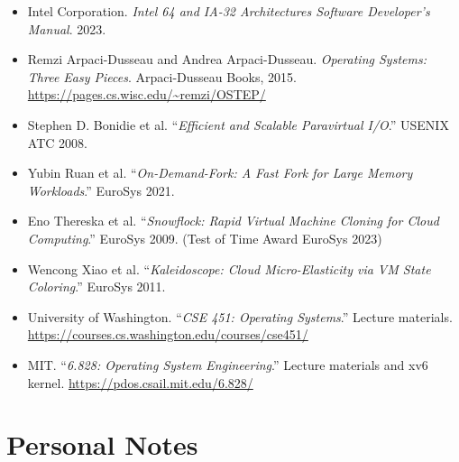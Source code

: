 \documentclass[11pt]{article}
\begin{document}
\begin{itemize}
    \item Intel Corporation. \textit{Intel 64 and IA-32 Architectures Software Developer's Manual}. 2023.
    \item Remzi Arpaci-Dusseau and Andrea Arpaci-Dusseau. \textit{Operating Systems: Three Easy Pieces}. Arpaci-Dusseau Books, 2015. \url{https://pages.cs.wisc.edu/~remzi/OSTEP/}
    \item Stephen D. Bonidie et al. ``\textit{Efficient and Scalable Paravirtual I/O}.'' USENIX ATC 2008.
    \item Yubin Ruan et al. ``\textit{On-Demand-Fork: A Fast Fork for Large Memory Workloads}.'' EuroSys 2021.
    \item Eno Thereska et al. ``\textit{Snowflock: Rapid Virtual Machine Cloning for Cloud Computing}.'' EuroSys 2009. (Test of Time Award EuroSys 2023)
    \item Wencong Xiao et al. ``\textit{Kaleidoscope: Cloud Micro-Elasticity via VM State Coloring}.'' EuroSys 2011.
    \item University of Washington. ``\textit{CSE 451: Operating Systems}.'' Lecture materials. \url{https://courses.cs.washington.edu/courses/cse451/}
    \item MIT. ``\textit{6.828: Operating System Engineering}.'' Lecture materials and xv6 kernel. \url{https://pdos.csail.mit.edu/6.828/}
\end{itemize}

\section*{Personal Notes}
\end{document}
